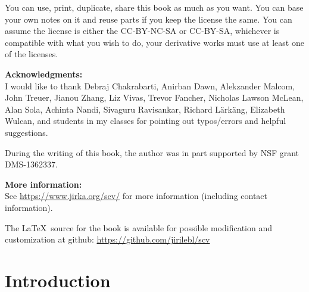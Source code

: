 \documentclass[12pt,openany]{book}
\theoremstyle{plain}
\theoremstyle{remark}
\theoremstyle{definition}
\theoremstyle{exercise}
\theoremstyle{example}
\begin{document}
\bigskip

\noindent
You can use, print, duplicate, share this book as much as you want.  You can
base your own notes on it and reuse parts if you keep the license the
same.  You can assume the license is either the CC-BY-NC-SA or CC-BY-SA\@,
whichever is compatible with what you wish to do, your derivative works must
use at least one of the licenses.

\bigskip

\noindent
\textbf{Acknowledgments:}
\\
I would like to thank Debraj Chakrabarti, Anirban Dawn, Alekzander Malcom,
John Treuer, Jianou Zhang, Liz Vivas, Trevor Fancher,
Nicholas Lawson McLean, Alan Sola, Achinta Nandi,
Sivaguru Ravisankar, Richard L\"ark\"ang, Elizabeth Wulcan,
and students in my classes for pointing out typos/errors
and helpful suggestions. 

\bigskip

\noindent
During the writing of this book, 
the author was in part supported by NSF grant DMS-1362337.

\bigskip

\noindent
\textbf{More information:}
\\
See \url{https://www.jirka.org/scv/} for more information
(including contact information).

\medskip

\noindent
The \LaTeX\ source for the book is available
for possible modification and customization
at github: \url{https://github.com/jirilebl/scv}



\tableofcontents
{}



\chapter*{Introduction} \label{ch:intro}
\end{document}
